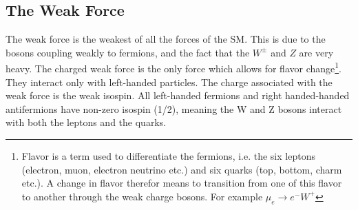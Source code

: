 \subsection{The Weak Force}
The weak force is the weakest of all the forces of the \ac{SM}. This is due to the bosons 
coupling weakly to fermions, and the fact that the $W^{\pm}$ and $Z$ are very heavy. The charged weak force
is the only force which allows for flavor change\footnote{Flavor is a term used to differentiate the 
fermions, i.e. the six leptons (electron, muon, electron neutrino etc.) and six quarks (top, bottom, charm etc.).
A change in flavor therefor means to transition from one of this flavor to another through the weak 
charge bosons. For example $\mu_e \rightarrow e^{-}W^+$ }. They interact only with left-handed particles. The charge associated with the weak force
is the weak isospin. All left-handed fermions and right handed-handed antifermions have non-zero isospin (1/2), 
meaning the W and Z bosons interact with both the leptons and the quarks.  